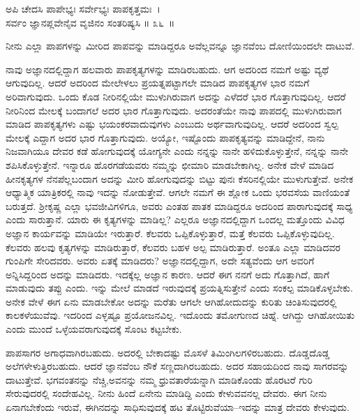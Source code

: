 \begin{shloka}
ಅಪಿ ಚೇದಸಿ ಪಾಪೇಭ್ಯಃ ಸರ್ವೇಭ್ಯಃ ಪಾಪಕೃತ್ತಮಃ~।\\ಸರ್ವಂ ಜ್ಞಾನಪ್ಲವೇನೈವ ವೃಜಿನಂ ಸಂತರಿಷ್ಯಸಿ \hfill॥ ೩೬~॥
\end{shloka}

\begin{artha}
ನೀನು ಎಲ್ಲಾ ಪಾಪಗಳನ್ನು ಮೀರಿದ ಪಾಪವನ್ನು ಮಾಡಿದ್ದರೂ ಅವೆಲ್ಲವನ್ನೂ ಜ್ಞಾನವೆಂಬ ದೋಣಿ\-ಯಿಂದಲೇ ದಾಟುವೆ.
\end{artha}

ನಾವು ಅಜ್ಞಾನದಲ್ಲಿದ್ದಾಗ ಹಲವಾರು ಪಾಪಕೃತ್ಯಗಳನ್ನು ಮಾಡಿರಬಹುದು. ಆಗ ಅದರಿಂದ ನಮಗೆ ಅಷ್ಟು ವ್ಯಥೆ ಆಗುವುದಿಲ್ಲ. ಆದರೆ ಅದರಿಂದ ಮೇಲೇಳಲು ಪ್ರಯತ್ನಪಟ್ಟಾಗಲೇ ಮಾಡಿದ ಪಾಪಕೃತ್ಯಗಳ ಭಾರ ನಮಗೆ ಅರಿವಾಗುವುದು. ಒಂದು ಕೊಡ ನೀರಿನಲ್ಲಿಯೇ ಮುಳುಗಿರುವಾಗ ಅದನ್ನು ಎಳೆದರೆ ಭಾರ ಗೊತ್ತಾಗುವುದಿಲ್ಲ. ಆದರೆ ನೀರಿನಿಂದ ಮೇಲಕ್ಕೆ ಬಂದಾಗಲೆ ಅದರ ಭಾರ ಗೊತ್ತಾಗುವುದು. ಅದರಂತೆಯೇ ನಾವು ಪಾಪದಲ್ಲಿ ಮುಳುಗಿರುವಾಗ ಮಾಡಿದ ಪಾಪಕೃತ್ಯಗಳು ಎಷ್ಟು ಭಯಂಕರವಾದುವುಗಳು ಎಂಬುದು ಅರ್ಥವಾಗುವುದಿಲ್ಲ. ಆದರೆ ಅದರಿಂದ ಸ್ವಲ್ಪ ಮೇಲಕ್ಕೆ ಎದ್ದಾಗ ಅದರ ಭಾರ ಗೊತ್ತಾಗುವುದು. ಅಯ್ಯೋ, ಇಷ್ಟೊಂದು ಪಾಪಕೃತ್ಯವನ್ನು ಮಾಡಿದ್ದೇನೆ, ನಾನು ನಿಜವಾಗಿಯೂ ದೇವರ ಕಡೆ ಹೋಗುವುದಕ್ಕೆ ಯೋಗ್ಯನೇ ಎಂದು ನನ್ನನ್ನು ನಾನೇ ಹಳಿದುಕೊಳ್ಳುತ್ತೇನೆ, ನನ್ನನ್ನು ನಾನೇ ಶಪಿಸಿಕೊಳ್ಳುತ್ತೇನೆ. ಇನ್ನಾರೂ ಹೊರಗಡೆಯವರು ನಮ್ಮನ್ನು ಛೀಮಾರಿ ಮಾಡಬೇಕಾಗಿಲ್ಲ. ಅನೇಕ ವೇಳೆ ಮಾಡಿದ ಹೀನಕೃತ್ಯಗಳ ನೆನಪೆಲ್ಲ\break ಬಂದಾಗ ಅದನ್ನು ಮೀರಿ ಹೋಗುವುದನ್ನು ಬಿಟ್ಟು ಪುನಃ ಕೆಸರಿನಲ್ಲಿಯೇ ಮುಳುಗುತ್ತೇವೆ. ಅನೇಕ ಆಧ್ಯಾತ್ಮಿಕ ಯಾತ್ರಿಕರಲ್ಲಿ ನಾವು ಇದನ್ನು ನೋಡುತ್ತೇವೆ. ಆಗಲೇ ನಮಗೆ ಈ ಶ್ಲೋಕ ಒಂದು ಭರವಸೆಯ ವಾಣಿಯಂತೆ ಬರುತ್ತದೆ. ಶ‍್ರೀಕೃಷ್ಣ ಎಲ್ಲಾ ಭವಜೀವಿಗಳಿಗೂ, ಅವರು ಎಂತಹ ಪಾತಕ ಮಾಡಿದ್ದರೂ ಅದರಿಂದ ಪಾರಾಗುವುದಕ್ಕೆ ಸಾಧ್ಯ ಎಂದು ಸಾರುತ್ತಾನೆ. ಯಾರು ಈ ಕೃತ್ಯಗಳನ್ನು ಮಾಡಿಲ್ಲ? ಎಲ್ಲರೂ ಅಜ್ಞಾನದಲ್ಲಿದ್ದಾಗ ಒಂದಲ್ಲ ಮತ್ತೊಂದು ವಿವಿಧ ಅಜ್ಞಾನ ಕಾರ್ಯವನ್ನು ಮಾಡಿಯೇ ಇರುತ್ತಾರೆ. ಕೆಲವರು ಒಪ್ಪಿಕೊಳ್ಳುತ್ತಾರೆ, ಮತ್ತೆ ಕೆಲವರು ಒಪ್ಪಿಕೊಳ್ಳುವುದಿಲ್ಲ. ಕೆಲವರು ಹಲವು ಕೃತ್ಯಗಳನ್ನು ಮಾಡಿರುತ್ತಾರೆ, ಕೆಲವರು ಬಹಳ ಅಲ್ಪ ಮಾಡಿರುತ್ತಾರೆ. ಅಂತೂ ಎಲ್ಲಾ ಮಾಡಿದವರ ಗುಂಪಿಗೇ ಸೇರಿದವರು. ಅವರು ಏತಕ್ಕೆ ಮಾಡಿದರು? ಅಜ್ಞಾನದಲ್ಲಿದ್ದಾಗ, ಅದೇ ಸತ್ಯವೆಂದು ಆಗ ಅವರಿಗೆ ಅನ್ನಿಸಿದ್ದರಿಂದ ಅದನ್ನು ಮಾಡಿದರು. ಇದಕ್ಕೆಲ್ಲ ಅಜ್ಞಾನ ಕಾರಣ. ಆದರೆ ಈಗ ನನಗೆ ಅದು ಗೊತ್ತಾಗಿದೆ, ಹಾಗೆ ಮಾಡುವುದು ತಪ್ಪು ಎಂದು. ಇನ್ನು ಮೇಲೆ ಮಾಡದೆ ಇರುವುದಕ್ಕೆ ಪ್ರಯತ್ನಿಸುತ್ತೇನೆ ಎಂದು ಸಂಕಲ್ಪ ಮಾಡಿಕೊಳ್ಳಬೇಕು. ಅನೇಕ ವೇಳೆ ಈಗ ಏನು ಮಾಡಬೇಕೋ ಅದನ್ನು ಮರೆತು ಆಗಲೇ ಆಗಿಹೋದುದನ್ನು ಕುರಿತು ಚಿಂತಿಸುವುದರಲ್ಲಿ ಕಾಲಕಳೆಯುವೆವು. ಇದರಿಂದ ಎಳ್ಳಷ್ಟೂ ಪ್ರಯೋಜನವಿಲ್ಲ. ಇದೊಂದು ತಮೋಗುಣದ ಚಿಹ್ನೆ. ಆಗಿದ್ದು ಆಗಿಹೋಯಿತು ಎಂದು ಮುಂದೆ ಒಳ್ಳೆಯವರಾಗುವುದಕ್ಕೆ ಸೊಂಟ ಕಟ್ಟಬೇಕು.

ಪಾಪಸಾಗರ ಅಗಾಧವಾಗಿರಬಹುದು. ಅದರಲ್ಲಿ ಬೇಕಾದಷ್ಟು ಮೊಸಳೆ ತಿಮಿಂಗಿಲಗಳಿರಬಹುದು. ದೊಡ್ಡದೊಡ್ಡ ಅಲೆಗಳೇಳುತ್ತಿರಬಹುದು. ಆದರೆ ಜ್ಞಾನವೆಂಬ ನೌಕೆ ಸಣ್ಣದಾಗಿರಬಹುದು. ಅದರ ಸಹಾಯದಿಂದ ನಾವು ಸಾಗರವನ್ನು ದಾಟುತ್ತೇವೆ. ಭಗವಂತನನ್ನು ನೆಚ್ಚಿ,\break ಅವನನ್ನು ನಮ್ಮ ಧ್ರುವತಾರೆಯನ್ನಾಗಿ ಮಾಡಿಕೊಂಡು ಹೊರಟರೆ ಗುರಿ ಸೇರುವುದರಲ್ಲಿ ಸಂದೇಹವಿಲ್ಲ. ನೀನು ಹಿಂದೆ ಏನೇನು ಮಾಡಿದ್ದಿ ಎಂದು ಕೇಳುವವನಲ್ಲ ದೇವರು. ಈಗ ನೀನು ಏನಾಗಬೇಕೆಂದು ಇರುವೆ, ಈಗಿನದನ್ನು ಸಾಧಿಸುವುದಕ್ಕೆ ಹಟ ತೊಟ್ಟಿರುವೆಯಾ–ಇದನ್ನು ಮಾತ್ರ ದೇವರು ಕೇಳುವುದು.

